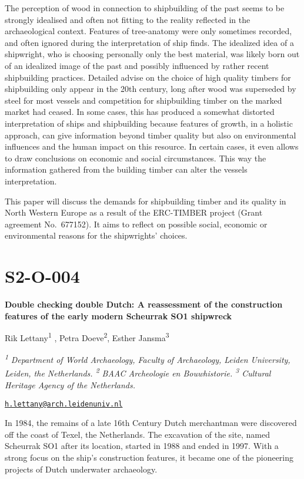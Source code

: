 \documentclass[
]{book}
\begin{document}
The perception of wood in connection to shipbuilding of the past seems to be strongly idealised and often not fitting to the reality reflected in the archaeological context. Features of tree-anatomy were only sometimes recorded, and often ignored during the interpretation of ship finds. The idealized idea of a shipwright, who is choosing personally only the best material, was likely born out of an idealized image of the past and possibly influenced by rather recent shipbuilding practices. Detailed advise on the choice of high quality timbers for shipbuilding only appear in the 20th century, long after wood was superseded by steel for most vessels and competition for shipbuilding timber on the marked market had ceased. In some cases, this has produced a somewhat distorted interpretation of ships and shipbuilding because features of growth, in a holistic approach, can give information beyond timber quality but also on environmental influences and the human impact on this resource. In certain cases, it even allows to draw conclusions on economic and social circumstances. This way the information gathered from the building timber can alter the vessels interpretation.

This paper will discuss the demands for shipbuilding timber and its quality in North Western Europe as a result of the ERC-TIMBER project (Grant agreement No.~677152). It aims to reflect on possible social, economic or environmental reasons for the shipwrights' choices.

\hypertarget{s2-o-004}{%
\section*{S2-O-004}\label{s2-o-004}}

\textbf{Double checking double Dutch: A reassessment of the construction features of the early modern Scheurrak SO1 shipwreck}

Rik Lettany\textsuperscript{1} , Petra Doeve\textsuperscript{2}, Esther Jansma\textsuperscript{3}

\textsuperscript{\emph{1}} \emph{Department of World Archaeology, Faculty of Archaeology, Leiden University, Leiden, the Netherlands. \textsuperscript{2} BAAC Archeologie en Bouwhistorie. \textsuperscript{3} Cultural Heritage Agency of the Netherlands.}

\href{mailto:h.lettany@arch.leidenuniv.nl}{\nolinkurl{h.lettany@arch.leidenuniv.nl}}

In 1984, the remains of a late 16th Century Dutch merchantman were discovered off the coast of Texel, the Netherlands. The excavation of the site, named Scheurrak SO1 after its location, started in 1988 and ended in 1997. With a strong focus on the ship's construction features, it became one of the pioneering projects of Dutch underwater archaeology.
\end{document}
